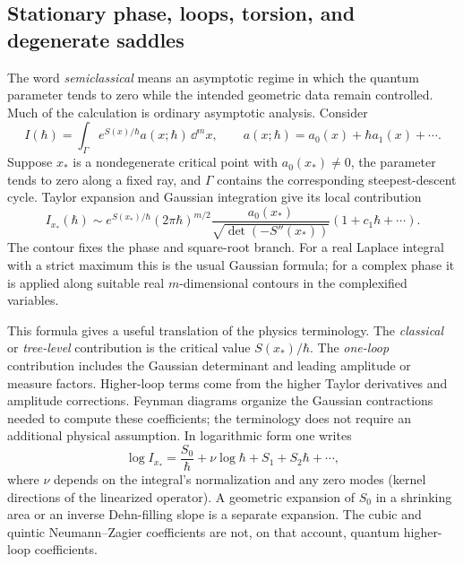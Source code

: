 \subsection{Stationary phase, loops, torsion, and degenerate saddles}
\label{sec:introsemiclassical}

The word \emph{semiclassical} means an asymptotic regime in which
the quantum parameter tends to zero while the intended geometric
data remain controlled. Much of the calculation is ordinary
asymptotic analysis. Consider
\begin{equation}
 I(\hbar)=\int_\Gamma e^{S(x)/\hbar}
                 a(x;\hbar)\,\dd^m x,
 \qquad a(x;\hbar)=a_0(x)+\hbar a_1(x)+\cdots.
 \label{eq:introsaddleintegral}
\end{equation}
Suppose $x_*$ is a nondegenerate critical point with $a_0(x_*)\ne0$,
the parameter tends
to zero along a fixed ray, and $\Gamma$ contains the corresponding
steepest-descent cycle. Taylor expansion and Gaussian integration
give its local contribution
\begin{equation}
 I_{x_*}(\hbar)\sim
 e^{S(x_*)/\hbar}(2\pi\hbar)^{m/2}
 \frac{a_0(x_*)}{\sqrt{\det(-S''(x_*))}}
 (1+c_1\hbar+\cdots).
 \label{eq:introgaussian}
\end{equation}
The contour fixes the phase and square-root branch. For a real
Laplace integral with a strict maximum this is the usual Gaussian
formula; for a complex phase it is applied along suitable real
$m$-dimensional contours in the complexified variables.

This formula gives a useful translation of the physics terminology.
The \emph{classical} or \emph{tree-level} contribution is the
critical value $S(x_*)/\hbar$. The \emph{one-loop} contribution
includes the Gaussian determinant and leading amplitude or measure
factors. Higher-loop terms come from the higher Taylor derivatives
and amplitude corrections. Feynman diagrams organize the Gaussian
contractions needed to compute these coefficients; the terminology
does not require an additional physical assumption. In logarithmic
form one writes
\[
 \log I_{x_*}=\frac{S_0}{\hbar}
      +\nu\log\hbar+S_1+S_2\hbar+\cdots,
\]
where $\nu$ depends on the integral's normalization and any zero
modes (kernel directions of the linearized operator). A geometric expansion of $S_0$ in a shrinking area or an
inverse Dehn-filling slope is a separate expansion. The cubic and
quintic Neumann--Zagier coefficients are not, on that account,
quantum higher-loop coefficients.

